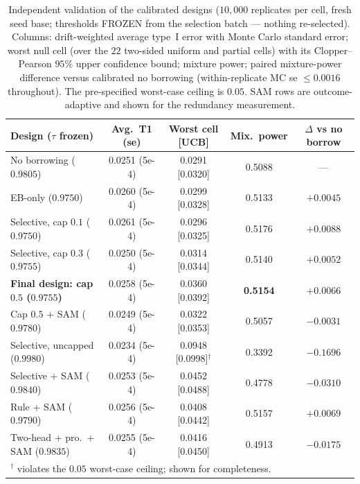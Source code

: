 \documentclass[11pt]{article}
\begin{document}
\begin{table}[htbp]
\centering
\small
\caption{Independent validation of the calibrated designs
($10{,}000$ replicates per cell, fresh seed base; thresholds FROZEN from
the selection batch --- nothing re-selected). Columns: drift-weighted
average type~I error with Monte Carlo standard error; worst null cell
(over the $22$ two-sided uniform and partial cells) with its
Clopper--Pearson $95\%$ upper confidence bound; mixture power; paired
mixture-power difference versus calibrated no borrowing
(within-replicate MC se $\le 0.0016$ throughout). The pre-specified
worst-case ceiling is $0.05$. SAM rows are outcome-adaptive and shown for
the redundancy measurement.}
\label{tab:calibrated}
\begin{tabular}{lcccc}
\hline
Design ($\tau$ frozen) & Avg.\ T1 (se) & Worst cell [UCB] & Mix.\ power &
$\Delta$ vs no borrow \\
\hline
No borrowing ($0.9805$)      & 0.0251 (5e-4) & 0.0291 [0.0320] & 0.5088 & --- \\
EB-only ($0.9750$)           & 0.0260 (5e-4) & 0.0299 [0.0328] & 0.5133 & $+0.0045$ \\
Selective, cap $0.1$ ($0.9750$) & 0.0261 (5e-4) & 0.0296 [0.0325] & 0.5176 & $+0.0088$ \\
Selective, cap $0.3$ ($0.9755$) & 0.0250 (5e-4) & 0.0314 [0.0344] & 0.5140 & $+0.0052$ \\
\textbf{Final design: cap $0.5$ ($0.9755$)} & 0.0258 (5e-4) & 0.0360 [0.0392]
& \textbf{0.5154} & $\mathbf{+0.0066}$ \\
Cap $0.5$ + SAM ($0.9780$)   & 0.0249 (5e-4) & 0.0322 [0.0353] & 0.5057 & $-0.0031$ \\
Selective, uncapped ($0.9980$) & 0.0234 (5e-4) & 0.0948 [0.0998]$^{\dagger}$ & 0.3392 & $-0.1696$ \\
Selective + SAM ($0.9840$)   & 0.0253 (5e-4) & 0.0452 [0.0488] & 0.4778 & $-0.0310$ \\
Rule + SAM ($0.9790$)        & 0.0256 (5e-4) & 0.0408 [0.0442] & 0.5157 & $+0.0069$ \\
Two-head + pro.\ + SAM ($0.9835$) & 0.0255 (5e-4) & 0.0416 [0.0450] & 0.4913 & $-0.0175$ \\
\hline
\multicolumn{5}{l}{\footnotesize $^{\dagger}$ violates the $0.05$
worst-case ceiling; shown for completeness.}\\
\end{tabular}
\end{table}
\end{document}
